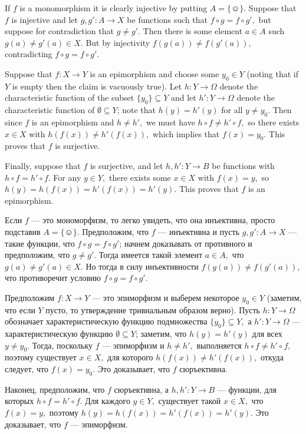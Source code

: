 \documentclass[../main/CT4S-EN-RU]{subfiles}
\begin{document}
\begin{proofENG}
If $f$ is a monomorphism it is clearly injective by putting $A={\{☺\}}.$ Suppose that $f$ is injective and let $g,g'\colon A{→} X$ be functions such that $f\circ g=f\circ g',$ but suppose for contradiction that $g\neq g'.$ Then there is some element $a\in A$ such $g(a)\neq g'(a)\in X.$ But by injectivity $f(g(a))\neq f(g'(a)),$ contradicting $f\circ g=f\circ g'.$

Suppose that $f\colon X{→} Y$ is an epimorphism and choose some $y_0\in Y$ (noting that if $Y$ is empty then the claim is vacuously true). Let $h\colon Y{→}\Omega$ denote the characteristic function of the subset $\{y_0\}\subseteq Y$ and let $h'\colon Y{→}\Omega$ denote the characteristic function of $\emptyset\subseteq Y$; note that $h(y)=h'(y)$ for all $y\neq y_0.$ Then since $f$ is an epimorphism and $h\neq h',$ we must have $h\circ f\neq h'\circ f,$ so there exists $x\in X$ with $h(f(x))\neq h'(f(x)),$ which implies that $f(x)=y_0.$ This proves that $f$ is surjective.

Finally, suppose that $f$ is surjective, and let $h,h'\colon Y{→} B$ be functions with $h\circ f=h'\circ f.$ For any $y\in Y,$ there exists some $x\in X$ with $f(x)=y,$ so $h(y)=h(f(x))=h'(f(x))=h'(y).$ This proves that $f$ is an epimorphism.
\end{proofENG}

\begin{proofRUS}
Если $f$ — это мономорфизм, то легко увидеть, что она инъективна, просто подставив $A={\{☺\}}.$ Предположим, что $f$ — инъективна и пусть $g,g'\colon A{→} X$ — такие функции, что $f\circ g=f\circ g'$; начнем доказывать от противного и предположим, что $g\neq g'.$ Тогда имеется такой элемент $a\in A,$ что $g(a)\neq g'(a)\in X.$ Но тогда в силу инъективности $f(g(a))\neq f(g'(a)),$ что противоречит условию $f\circ g=f\circ g'.$

Предположим $f\colon X{→} Y$ — это эпиморфизм и выберем некоторое $y_0\in Y$ (заметим, что если $Y$ пусто, то утверждение тривиальным образом верно). Пусть $h\colon Y{→}\Omega$ обозначает характеристическую функцию подмножества $\{y_0\}\subseteq Y,$ а $h'\colon Y{→}\Omega$ — характеристическую функцию $\emptyset\subseteq Y$; заметим, что $h(y)=h'(y)$ для всех $y\neq y_0.$ Тогда, поскольку $f$ — эпиморфизм и $h\neq h',$ выполняется $h\circ f\neq h'\circ f,$ поэтому существует $x\in X,$ для которого $h(f(x))\neq h'(f(x)),$ откуда следует, что $f(x)=y_0.$ Это доказывает, что $f$ сюръективна.

Наконец, предположим, что $f$ сюръективна, а $h,h'\colon Y{→} B$ — функции, для которых $h\circ f=h'\circ f.$ Для каждого $y\in Y,$ существует такой $x\in X,$ что $f(x)=y,$ поэтому $h(y)=h(f(x))=h'(f(x))=h'(y).$ Это доказывает, что $f$ — эпиморфизм.
\end{proofRUS}
\end{document}
